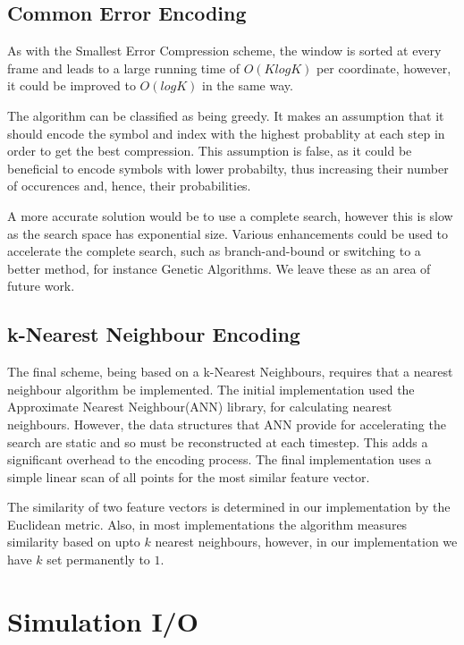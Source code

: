 \documentclass[a4paper,11pt]{report}
\begin{document}
\subsection{Common Error Encoding}

As with the Smallest Error Compression scheme, the window is sorted at every frame and leads to a large running time of $O(KlogK)$ per coordinate, however, it could be improved to $O(logK)$ in the same way.

The algorithm can be classified as being greedy. It makes an assumption that it should encode the symbol and index with the highest probablity at each step in order to get the best compression. This assumption is false, as it could be beneficial to encode symbols with lower probabilty, thus increasing their number of occurences and, hence, their probabilities. 

A more accurate solution would be to use a complete search, however this is slow as the search space has exponential size. Various enhancements could be used to accelerate the complete search, such as branch-and-bound or switching to a better method, for instance Genetic Algorithms. We leave these as an area of future work.

\subsection{k-Nearest Neighbour Encoding}

The final scheme, being based on a k-Nearest Neighbours, requires that a nearest neighbour algorithm be implemented. The initial implementation used the Approximate Nearest Neighbour(ANN) library, for calculating nearest neighbours. However, the data structures that ANN provide for accelerating the search are static and so must be reconstructed at each timestep. This adds a significant overhead to the encoding process. The final implementation uses a simple linear scan of all points for the most similar feature vector.

The similarity of two feature vectors is determined in our implementation by the Euclidean metric. Also, in most implementations the algorithm measures similarity based on upto $k$ nearest neighbours, however, in our implementation we have $k$ set permanently to $1$.

\section{Simulation I/O}
\end{document}
